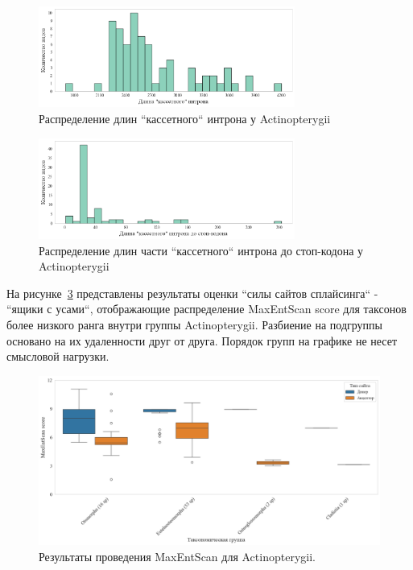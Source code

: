 \begin{figure}[hb] %
    \centering
    \includegraphics[width=0.75\textwidth]{images/Actinopterygii_intron}
    \caption{Распределение длин ``кассетного`` интрона у Actinopterygii}
    \label{fig:Actinopterygii_intron}
\end{figure}

\begin{figure}[ht] %
    \centering
    \includegraphics[width=0.75\textwidth]{images/Actinopterygii_intron_stop}
    \caption{Распределение длин части ``кассетного`` интрона до стоп-кодона у Actinopterygii}
    \label{fig:Actinopterygii_intron_stop}
\end{figure}

На рисунке~\ref{fig:Actinopterygii_maxentscan} представлены результаты оценки ``силы сайтов сплайсинга`` - ``ящики с усами``, отображающие распределение MaxEntScan score для таксонов более низкого ранга внутри группы Actinopterygii.
Разбиение на подгруппы основано на их удаленности друг от друга.
Порядок групп на графике не несет смысловой нагрузки.

\begin{figure}[h] %
    \centering
    \includegraphics[width=1.0\textwidth]{images/Actinopterygii_maxentscan}
    \caption{Результаты проведения MaxEntScan для Actinopterygii.}
    \label{fig:Actinopterygii_maxentscan}
\end{figure}


